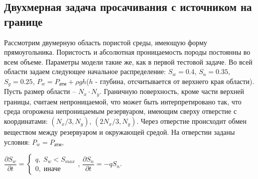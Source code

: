 \subsection{Двухмерная задача просачивания с источником на границе}
Рассмотрим двумерную область пористой среды, имеющую форму
прямоугольника. Пористость и абсолютная проницаемость породы постоянны во всем
объеме. Параметры модели такие же, как
в первой тестовой задаче.
Во всей области задаем следующее 
начальное распределение: $S_w=0.4$,\; $S_n=0.35$,\; $S_g=0.25$, 
$P_w=P_\text{атм}+\rho g h$($h$ - глубина, отсчитывается от верхнего края области).
Пусть размер области -- $N_x\cdot N_y$.
Граничную поверхность, кроме части верхней границы, считаем непроницаемой, 
что может быть интерпретировано так,
что среда огорожена непроницаемым резервуаром, имеющим сверху отверстие с
координатами: $(N_x/3, N_y)$, $(2N_x/3, N_y)$. Через отверстие происходит обмен веществом между 
резервуаром и окружающей средой. На отверстии заданы условия: $P_w=P_\text{атм}$,

$ \dfrac{\partial S_w}{\partial t}= 
\begin{cases}
 q, \; S_w<S_{max}\\
 0, \; \text{иначе}
\end{cases}
$,
$ \dfrac{\partial S_n}{\partial t}=-q S_n$.

